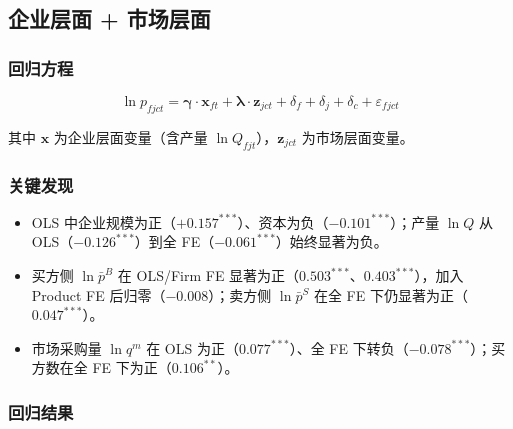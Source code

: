 \documentclass[12pt]{article}
\begin{document}
\subsection{企业层面 + 市场层面}

\subsubsection*{回归方程}

\begin{equation}
  \ln p_{fjct} = \boldsymbol{\gamma} \cdot \mathbf{x}_{ft}
    + \boldsymbol{\lambda} \cdot \mathbf{z}_{jct}
    + \delta_f + \delta_j + \delta_c + \varepsilon_{fjct}
\end{equation}

其中 $\mathbf{x}$ 为企业层面变量（含产量 $\ln Q_{fjt}$），$\mathbf{z}_{jct}$ 为市场层面变量。

\subsubsection*{关键发现}

\begin{itemize}[nosep]
  \item OLS 中企业规模为正（$+0.157^{***}$）、资本为负（$-0.101^{***}$）；产量 $\ln Q$ 从 OLS（$-0.126^{***}$）到全 FE（$-0.061^{***}$）始终显著为负。
  \item 买方侧 $\ln\bar{p}^{B}$ 在 OLS/Firm FE 显著为正（$0.503^{***}$、$0.403^{***}$），加入 Product FE 后归零（$-0.008$）；卖方侧 $\ln\bar{p}^{S}$ 在全 FE 下仍显著为正（$0.047^{***}$）。
  \item 市场采购量 $\ln q^m$ 在 OLS 为正（$0.077^{***}$）、全 FE 下转负（$-0.078^{***}$）；买方数在全 FE 下为正（$0.106^{**}$）。
\end{itemize}



\subsubsection*{回归结果}
\end{document}
